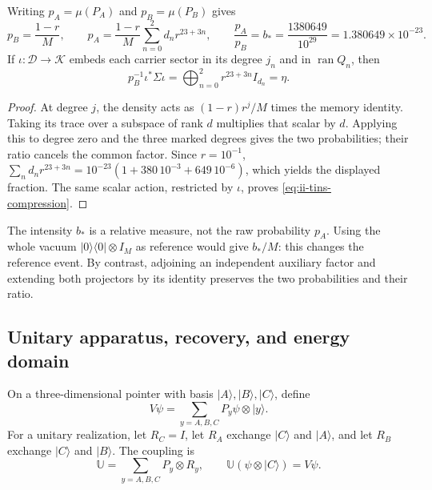 \begin{samepage}
\begin{proposition}
\label{prop:ii-tins-relative}
Writing $p_A=\mu(P_A)$ and $p_B=\mu(P_B)$ gives
\begin{equation}
 p_B=\frac{1-r}{M},\qquad
 p_A=\frac{1-r}{M}\sum_{n=0}^2d_nr^{23+3n},\qquad
 \frac{p_A}{p_B}=b_*=
 \frac{1380649}{10^{29}}=1.380649\times10^{-23}.
 \label{eq:ii-tins-relative}
\end{equation}
If $\iota:\mathcal D\to\mathcal K$ embeds each carrier sector in its
degree $j_n$ and in $\operatorname{ran}Q_n$, then
\begin{equation}
 p_B^{-1}\iota^*\Sigma\iota
 =\bigoplus_{n=0}^2r^{23+3n}I_{d_n}=\eta.
 \label{eq:ii-tins-compression}
\end{equation}
\end{proposition}
\end{samepage}
\begin{proof}
At degree $j$, the density acts as $(1-r)r^j/M$ times the memory
identity. Taking its trace over a subspace of rank $d$ multiplies that
scalar by $d$. Applying this to degree zero and the three marked degrees
gives the two probabilities; their ratio cancels the common factor.
Since $r=10^{-1}$,
$\sum_nd_nr^{23+3n}=10^{-23}(1+380\,10^{-3}+649\,10^{-6})$,
which yields the displayed fraction. The same scalar action, restricted
by $\iota$, proves \eqref{eq:ii-tins-compression}.
\end{proof}

The intensity $b_*$ is a relative measure, not the raw probability $p_A$.
Using the whole vacuum $|0\rangle\langle0|\otimes I_M$ as reference
would give $b_*/M$: this changes the reference event. By contrast, adjoining
an independent auxiliary factor and extending both projectors by its
identity preserves the two probabilities and their ratio.

\subsection{Unitary apparatus, recovery, and energy domain}
\label{subsec:ii-tins-aparato}

On a three-dimensional pointer with basis $|A\rangle,|B\rangle,|C\rangle$,
define
\begin{equation}
 V\psi=\sum_{y=A,B,C}P_y\psi\otimes|y\rangle.
 \label{eq:ii-tins-isometry}
\end{equation}
For a unitary realization, let $R_C=I$, let $R_A$ exchange $|C\rangle$
and $|A\rangle$, and let $R_B$ exchange $|C\rangle$ and $|B\rangle$.
The coupling is
\begin{equation}
 \mathbb U=\sum_{y=A,B,C}P_y\otimes R_y,
 \qquad \mathbb U(\psi\otimes|C\rangle)=V\psi.
 \label{eq:ii-tins-unitary}
\end{equation}

